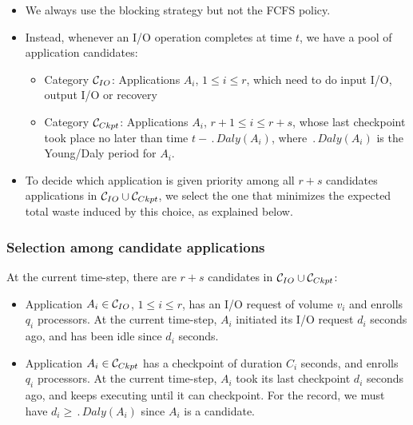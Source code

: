 \begin{itemize}
  \item We always use the blocking strategy but not the FCFS policy.
  \item Instead, whenever an I/O operation completes at time $t$, we have a pool of application candidates:
  \begin{itemize}
   \item Category \IOcat $\mathcal{C}_{IO}$: Applications $A_{i}$, $1\leq i \leq r$, which need to do input I/O, output I/O or recovery
  \item Category \Ckptcat $\mathcal{C}_{Ckpt}$: Applications $A_{i}$, $r+1\leq i \leq r+s$,
  whose last checkpoint took place no later than time $t - \period{Daly}(A_{i})$, where $\period{Daly}(A_{i})$ is the Young/Daly period for $A_{i}$.
  \end{itemize}
  \item To decide which application is given priority among all $r+s$ candidates applications in $\mathcal{C}_{IO} \cup \mathcal{C}_{Ckpt}$, we select the one that minimizes the expected total waste induced by this choice, as explained below.
  \end{itemize}

 \subsubsection{Selection among candidate applications}

At the current time-step, there are $r+s$ candidates in $\mathcal{C}_{IO} \cup \mathcal{C}_{Ckpt}$:
\begin{itemize}
  \item Application $A_{i} \in \mathcal{C}_{IO}$, $1\leq i \leq r$,
  has an I/O request of volume $v_{i}$ and enrolls $q_{i}$ processors. At the current time-step, $A_{i}$ initiated its I/O request $d_{i}$ seconds ago, and has been idle since $d_{i}$ seconds.
 \item Application $A_{i} \in  \mathcal{C}_{Ckpt}$ has a checkpoint of duration $C_{i}$ seconds,
  and enrolls $q_{i}$ processors. At the current time-step, $A_{i}$ took its last checkpoint
  $d_{i}$ seconds ago, and keeps executing until it can checkpoint. For the record, we must have $d_{i} \geq \period{Daly}(A_{i})$
  since $A_{i}$ is a candidate.
  \end{itemize}

